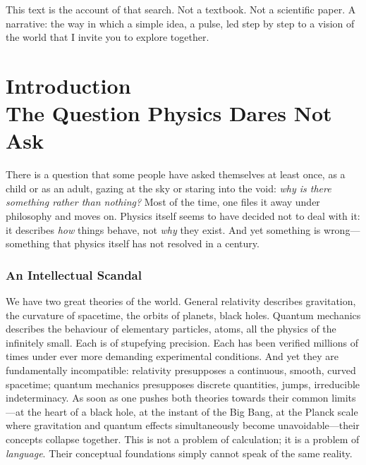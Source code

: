 \documentclass[12pt, a4paper, openright]{book}
\begin{document}
\medskip

This text is the account of that search. Not a textbook. Not a scientific paper. A narrative: the way in which a simple idea, a pulse, led step by step to a vision of the world that I invite you to explore together.

\clearpage

\chapter[Introduction]{Introduction\\ The Question Physics Dares Not Ask}

There is a question that some people have asked themselves at least once, as a child or as an adult, gazing at the sky or staring into the void: \emph{why is there something rather than nothing?} Most of the time, one files it away under philosophy and moves on. Physics itself seems to have decided not to deal with it: it describes \emph{how} things behave, not \emph{why} they exist. And yet something is wrong---something that physics itself has not resolved in a century.

\subsection*{An Intellectual Scandal}

We have two great theories of the world. General relativity describes gravitation, the curvature of spacetime, the orbits of planets, black holes. Quantum mechanics describes the behaviour of elementary particles, atoms, all the physics of the infinitely small. Each is of stupefying precision. Each has been verified millions of times under ever more demanding experimental conditions. And yet they are fundamentally incompatible: relativity presupposes a continuous, smooth, curved spacetime; quantum mechanics presupposes discrete quantities, jumps, irreducible indeterminacy. As soon as one pushes both theories towards their common limits---at the heart of a black hole, at the instant of the Big Bang, at the Planck scale where gravitation and quantum effects simultaneously become unavoidable---their concepts collapse together. This is not a problem of calculation; it is a problem of \emph{language}. Their conceptual foundations simply cannot speak of the same reality.

\medskip
\end{document}
